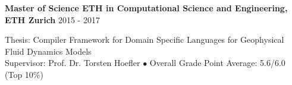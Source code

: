 \textbf{Master of Science ETH in Computational Science and Engineering, ETH Zurich} \hfill 2015 - 2017

Thesis: Compiler Framework for Domain Specific Languages for Geophysical Fluid Dynamics Models \\
Supervisor: Prof. Dr. Torsten Hoefler $\bullet$ Overall Grade Point Average: 5.6/6.0 (Top 10\%) \\
